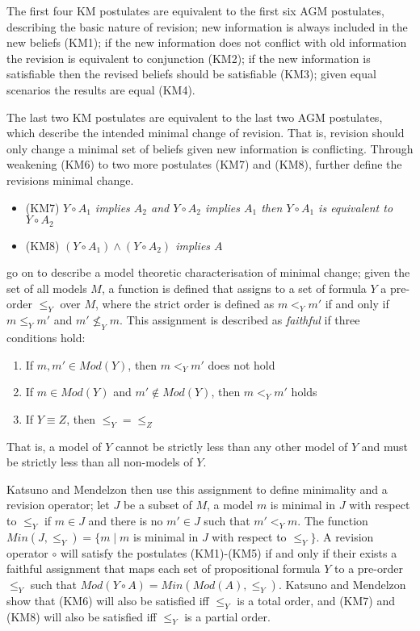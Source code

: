 The first four KM postulates are equivalent to the first six AGM postulates, describing the basic nature of revision;
new information is always included in the new beliefs (KM1); if the new information does not conflict with old information the revision is equivalent to conjunction (KM2);
if the new information is satisfiable then the revised beliefs should be satisfiable (KM3); given equal scenarios the results are equal (KM4).

The last two KM postulates are equivalent to the last two AGM postulates, which describe the intended minimal change of revision.
That is, revision should only change a minimal set of beliefs given new information is conflicting.
Through weakening (KM6) to two more postulates (KM7) and (KM8), \citep{katsuno1991propositional} further define the revisions minimal change.

\begin{itemize}
  \item (KM7) \textit{ $Y \circ A_1$  implies $A_2$ and $Y \circ A_2$ implies $A_1$ then $Y \circ A_1$ is equivalent to $Y \circ A_2$}
  \item (KM8) \textit{ $(Y \circ A_1) \wedge (Y \circ A_2)$ implies $A$}
\end{itemize}

\citep{katsuno1991propositional} go on to describe a model theoretic characterisation of minimal change; 
given the set of all models $M$, a function is defined that assigns to a set of formula $Y$ a pre-order $\leq_{Y}$ over $M$,
where the strict order is defined as $m <_Y m'$ if and only if $m \leq_Y m'$ and $m' \not \leq_Y m$. 
This assignment is described as \textit{faithful} if three conditions hold:
\begin{enumerate}
  \item If $m,m' \in Mod(Y)$, then $m <_Y m'$ does not hold
  \item If $m \in Mod(Y)$ and $m' \not\in Mod(Y)$, then $m <_Y m'$ holds
  \item If $Y \equiv Z$, then $\leq_Y = \leq_Z$  
\end{enumerate}

That is, a model of $Y$ cannot be strictly less than any other model of $Y$ and must be strictly less than all non-models of $Y$.

Katsuno and Mendelzon then use this assignment to define minimality and a revision operator; 
let $J$ be a subset of $M$, 
a model $m$ is minimal in $J$ with respect to $\leq_{Y}$ if $m \in J$ and there is no $m' \in J$ such that $m' <_Y m$. 
The function $Min(J,\leq_{Y}) = \{ m \mid m$ is minimal in $J$ with respect to $\leq_{Y} \}$.
A revision operator $\circ$ will satisfy the postulates (KM1)-(KM5) if and only if
their exists a faithful assignment that maps each set of propositional formula $Y$ to a pre-order $\leq_{Y}$
such that $Mod(Y \circ A) = Min(Mod(A),\leq_{Y})$.
Katsuno and Mendelzon show that (KM6) will also be satisfied iff $\leq_{Y}$ is a total order,
and (KM7) and (KM8) will also be satisfied iff $\leq_{Y}$ is a partial order.

